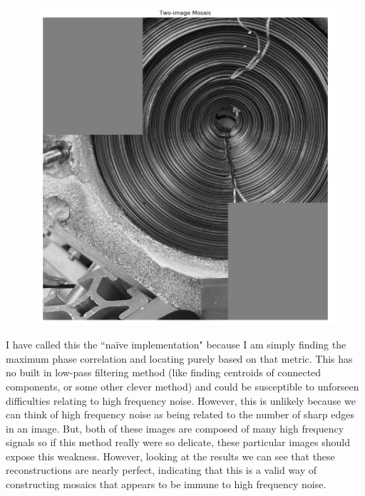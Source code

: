 \documentclass[]{article}
\begin{document}
\begin{figure}[H]
	\centering
	\includegraphics[width=6.5in]{p3_output/img_1_mosaic.png}
\end{figure}
\vskip 5pt
I have called this the ``na\"ive implementation" because I am simply finding the maximum phase correlation and locating purely based on that metric. This has no built in low-pass filtering method (like finding centroids of connected components, or some other clever method) and could be susceptible to unforseen difficulties relating to high frequency noise. However, this is unlikely because we can think of high frequency noise as being related to the number of sharp edges in an image. But, both of these images are composed of many high frequency signals so if this method really were so delicate, these particular images should expose this weakness. However, looking at the results we can see that these reconstructions are nearly perfect, indicating that this is a valid way of constructing mosaics that appears to be immune to high frequency noise.
\end{document}
